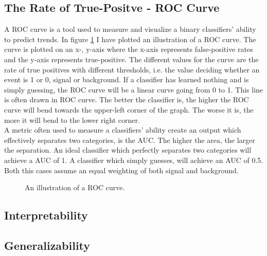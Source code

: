 \subsection{The Rate of True-Positve - ROC Curve}\label{subsec:AUC}
A \ac{ROC} curve is a tool used to measure and visualize a binary classifiers' ability 
to predict trends. In figure \ref{fig:ROC} I have plotted an illustration of a \ac{ROC} curve.
The curve is plotted on an x-, y-axis where the x-axis represents 
false-positive rates and the y-axis represents true-positive. The different values 
for the curve are the rate of true positives with different thresholds, i.e. 
the value deciding whether an event is 1 or 0, signal or background. If a classifier 
has learned nothing and is simply guessing, the \ac{ROC} curve will be a linear curve 
going from 0 to 1. This line is often drawn in \ac{ROC} curve. The better the 
classifier is, the higher the \ac{ROC} curve will bend towards the upper-left corner of the 
graph. The worse it is, the more it will bend to the lower right corner. 
\\
A metric often used to measure a classifiers' ability create an output which effectively 
separates two categories, is the \ac{AUC}. The higher the area, the larger the separation. 
An ideal classifier which perfectly separates two categories will achieve a \ac{AUC} of 1.
A classifier which simply guesses, will achieve an \ac{AUC} of 0.5. Both this cases assume 
an equal weighting of both signal and background. 
\begin{figure}
    \centering
    \caption{An illustration of a ROC curve.}
    \label{fig:ROC}
\end{figure}
\subsection{Interpretability}


\subsection{Generalizability}